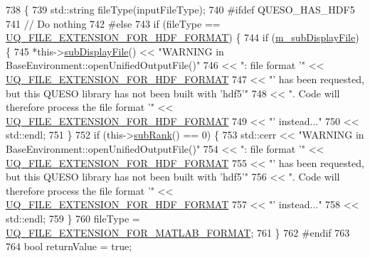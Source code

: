 \begin{DoxyCode}
738 \{
739   std::string fileType(inputFileType);
740 \textcolor{preprocessor}{#ifdef QUESO\_HAS\_HDF5}
741 \textcolor{preprocessor}{}  \textcolor{comment}{// Do nothing}
742 \textcolor{preprocessor}{#else}
743 \textcolor{preprocessor}{}  \textcolor{keywordflow}{if} (fileType == \hyperlink{_defines_8h_a4ebcc075277d031eb97c90b9a45f4493}{UQ\_FILE\_EXTENSION\_FOR\_HDF\_FORMAT}) \{
744     \textcolor{keywordflow}{if} (\hyperlink{class_q_u_e_s_o_1_1_base_environment_a52b4275aa8ee85994dd304d9fe95c9c5}{m\_subDisplayFile}) \{
745       *this->\hyperlink{class_q_u_e_s_o_1_1_base_environment_a8a0064746ae8dddfece4229b9ad374d6}{subDisplayFile}() << \textcolor{stringliteral}{"WARNING in BaseEnvironment::openUnifiedOutputFile()"}
746                               << \textcolor{stringliteral}{": file format '"} << 
      \hyperlink{_defines_8h_a4ebcc075277d031eb97c90b9a45f4493}{UQ\_FILE\_EXTENSION\_FOR\_HDF\_FORMAT}
747                               << \textcolor{stringliteral}{"' has been requested, but this QUESO library has not been built with
       'hdf5'"}
748                               << \textcolor{stringliteral}{". Code will therefore process the file format '"} << 
      \hyperlink{_defines_8h_a4ebcc075277d031eb97c90b9a45f4493}{UQ\_FILE\_EXTENSION\_FOR\_HDF\_FORMAT}
749                               << \textcolor{stringliteral}{"' instead..."}
750                               << std::endl;
751     \}
752     \textcolor{keywordflow}{if} (this->\hyperlink{class_q_u_e_s_o_1_1_base_environment_a172d52f993f1322ed45aaddf71518dbb}{subRank}() == 0) \{
753       std::cerr << \textcolor{stringliteral}{"WARNING in BaseEnvironment::openUnifiedOutputFile()"}
754                 << \textcolor{stringliteral}{": file format '"} << \hyperlink{_defines_8h_a4ebcc075277d031eb97c90b9a45f4493}{UQ\_FILE\_EXTENSION\_FOR\_HDF\_FORMAT}
755                 << \textcolor{stringliteral}{"' has been requested, but this QUESO library has not been built with 'hdf5'"}
756                 << \textcolor{stringliteral}{". Code will therefore process the file format '"} << 
      \hyperlink{_defines_8h_a4ebcc075277d031eb97c90b9a45f4493}{UQ\_FILE\_EXTENSION\_FOR\_HDF\_FORMAT}
757                 << \textcolor{stringliteral}{"' instead..."}
758                 << std::endl;
759     \}
760     fileType = \hyperlink{_defines_8h_ac440026eff7deb1c1eed1eea0e8e36ba}{UQ\_FILE\_EXTENSION\_FOR\_MATLAB\_FORMAT};
761   \}
762 \textcolor{preprocessor}{#endif}
763 \textcolor{preprocessor}{}
764   \textcolor{keywordtype}{bool} returnValue = \textcolor{keyword}{true};

\end{DoxyCode}
